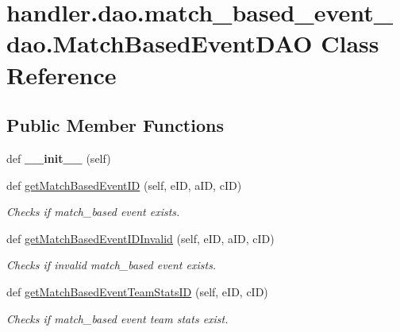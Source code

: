 \hypertarget{classhandler_1_1dao_1_1match__based__event__dao_1_1_match_based_event_d_a_o}{}\section{handler.\+dao.\+match\+\_\+based\+\_\+event\+\_\+dao.\+Match\+Based\+Event\+D\+AO Class Reference}
\label{classhandler_1_1dao_1_1match__based__event__dao_1_1_match_based_event_d_a_o}
\subsection*{Public Member Functions}
\begin{DoxyCompactItemize}
\item 
\mbox{\label{classhandler_1_1dao_1_1match__based__event__dao_1_1_match_based_event_d_a_o_aacfe677e2de22d7bb6c79c4bf17f7f6f}} 
def {\bfseries \+\_\+\+\_\+init\+\_\+\+\_\+} (self)
\item 
def \hyperlink{classhandler_1_1dao_1_1match__based__event__dao_1_1_match_based_event_d_a_o_acdce2914ac8adf47ccc6b10e5241b799}{get\+Match\+Based\+Event\+ID} (self, e\+ID, a\+ID, c\+ID)
\begin{DoxyCompactList}\small\item\em Checks if match\+\_\+based event exists. \end{DoxyCompactList}\item 
def \hyperlink{classhandler_1_1dao_1_1match__based__event__dao_1_1_match_based_event_d_a_o_a0d17198c4d0ce1f571cb47ca480405b8}{get\+Match\+Based\+Event\+I\+D\+Invalid} (self, e\+ID, a\+ID, c\+ID)
\begin{DoxyCompactList}\small\item\em Checks if invalid match\+\_\+based event exists. \end{DoxyCompactList}\item 
def \hyperlink{classhandler_1_1dao_1_1match__based__event__dao_1_1_match_based_event_d_a_o_a7c1ae439cb935207a8340064deb07905}{get\+Match\+Based\+Event\+Team\+Stats\+ID} (self, e\+ID, c\+ID)
\begin{DoxyCompactList}\small\item\em Checks if match\+\_\+based event team stats exist. \end{DoxyCompactList}\item 

\end{DoxyCompactItemize}
